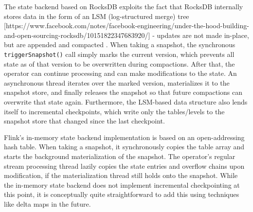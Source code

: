 
The state backend based on RocksDB exploits the fact that RocksDB internally stores data in the form of an LSM (log-structured merge) tree [https://www.facebook.com/notes/facebook-engineering/under-the-hood-building-and-open-sourcing-rocksdb/10151822347683920/] - updates are not made in-place, but are appended and compacted . When taking a snapshot, the synchronous \texttt{triggerSnapshot()} call simply marks the current version, which prevents all state as of that version to be overwritten during compactions. After that, the operator can continue processing and can make modifications to the state. An asynchronous thread iterates over the marked version, materializes it to the snapshot store, and finally releases the snapshot so that future compactions can overwrite that state again. Furthermore, the LSM-based data structure also lends itself to incremental checkpoints, which write only the tables/levels  to the snapshot store that changed since the last checkpoint.

Flink's in-memory state backend implementation is based on an open-addressing hash table. When taking a snapshot, it synchronously copies the table array and starts the background materialization of the snapshot. The operator's regular stream processing thread lazily copies the state entries and overflow chains upon modification, if the materialization thread still holds onto the snapshot. While the in-memory state backend does not implement incremental checkpointing at this point, it is conceptually quite straightforward to add this using techniques like delta maps in the future.


